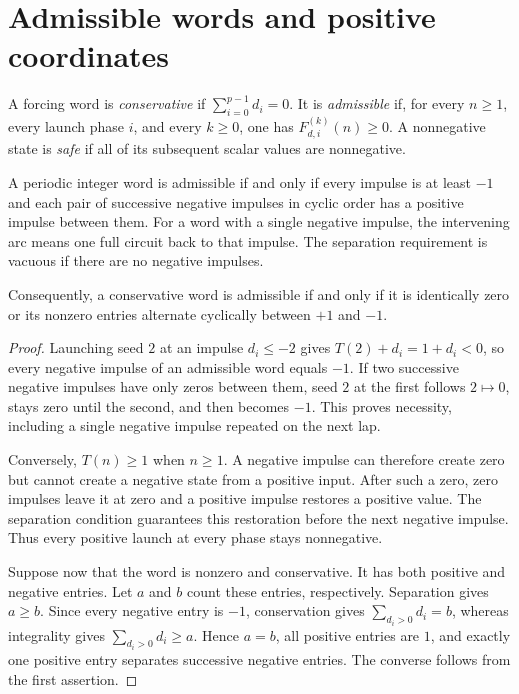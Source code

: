 \section{Admissible words and positive coordinates}\label{sec:foundations}

\begin{definition}\label{def:admissible}
A forcing word is \emph{conservative} if $\sum_{i=0}^{p-1}d_i=0$.
It is \emph{admissible} if, for every $n\ge1$, every launch phase $i$,
and every $k\ge0$, one has $F_{d,i}^{(k)}(n)\ge0$.
A nonnegative state is \emph{safe} if all of its subsequent scalar
values are nonnegative.
\end{definition}

\begin{theorem}\label{thm:admissibility}
A periodic integer word is admissible if and only if every impulse is
at least $-1$ and each pair of successive negative impulses in cyclic
order has a positive impulse between them. For a word with a single
negative impulse, the intervening arc means one full circuit back to
that impulse. The separation requirement is vacuous if there are no
negative impulses.

Consequently, a conservative word is admissible if and only if it is
identically zero or its nonzero entries alternate cyclically between
$+1$ and $-1$.
\end{theorem}
\begin{proof}
Launching seed $2$ at an impulse $d_i\le-2$ gives
$T(2)+d_i=1+d_i<0$, so every negative impulse of an admissible word
equals $-1$. If two successive negative impulses have only zeros
between them, seed $2$ at the first follows $2\mapsto0$, stays zero
until the second, and then becomes $-1$. This proves necessity,
including a single negative impulse repeated on the next lap.

Conversely, $T(n)\ge1$ when $n\ge1$. A negative impulse can therefore
create zero but cannot create a negative state from a positive input.
After such a zero, zero impulses leave it at zero and a positive
impulse restores a positive value. The separation condition guarantees
this restoration before the next negative impulse. Thus every
positive launch at every phase stays nonnegative.

Suppose now that the word is nonzero and conservative. It has both
positive and negative entries. Let $a$ and $b$ count these entries,
respectively. Separation gives $a\ge b$. Since every negative entry
is $-1$, conservation gives
$\sum_{d_i>0}d_i=b$, whereas integrality gives
$\sum_{d_i>0}d_i\ge a$. Hence $a=b$, all positive entries are $1$,
and exactly one positive entry separates successive negative entries.
The converse follows from the first assertion.
\end{proof}

